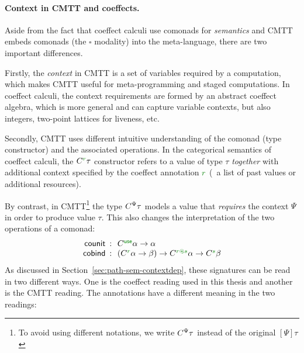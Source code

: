 \paragraph{Context in CMTT and coeffects.}
Aside from the fact that coeffect calculi use comonads for \emph{semantics} and CMTT embeds
comonads (the $\square$ modality) into the meta-language, there are two important differences.

Firstly, the \emph{context} in CMTT is a set of variables required by a computation, which
makes CMTT useful for meta-programming and staged computations. In coeffect calculi, the context
requirements are formed by an abstract coeffect algebra, which is more general and can capture
variable contexts, but also integers, two-point lattices for liveness, etc.

Secondly, CMTT uses different intuitive understanding of the comonad (type constructor) and
the associated operations. In the categorical semantics of coeffect calculi, the $\ctyp{\cclrd{r}}{\tau}$
constructor refers to a value of type $\tau$ \emph{together} with additional context specified
by the coeffect annotation $\cclrd{r}$ (\eg~a list of past values or additional resources).

By contrast, in CMTT\footnote{To avoid using different notations, we write $C^{\Psi}\tau$ instead of the
original $[\Psi]{\tau}$} the type $C^{\Psi}\tau$ models a value that \emph{requires} the
context $\Psi$ in order to produce value $\tau$. This also changes the interpretation of the
two operations of a comonad:
\begin{equation*}
\begin{array}{rcl}
 \ident{counit} &\narrow{:}& \ctyp{\cunit}{\alpha} \rightarrow \alpha\\
 \ident{cobind} &\narrow{:}& (\ctyp{\cclrd{r}}{\alpha} \rightarrow \beta) \rightarrow
    \ctyp{\cclrd{r}\cseq\cclrd{s}}{\alpha} \rightarrow \ctyp{\cclrd{s}}{\beta}
\end{array}
\end{equation*}
As discussed in Section~\ref{sec:path-sem-contextdep}, these signatures can be read in two different
ways. One is the coeffect reading used in this thesis and another is the CMTT reading. The
annotations have a different meaning in the two readings:

